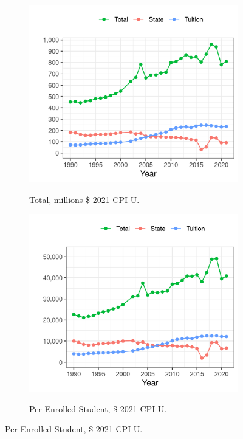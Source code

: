 \documentclass[notitlepage,12pt]{article}
\begin{document}
\begin{figure}[h!]
    \centering
    \singlespacing
    \caption{Mean Revenues among Illinois Public Universities, by Year.}
    \begin{subfigure}[b]{0.495\textwidth}
        \centering
        \caption{Total, millions \$ 2021 CPI-U.}
        \includegraphics[width=\textwidth]{figures/illinois-funding-total.png}
        \label{fig:illinois-funding-total}
    \end{subfigure}
    \begin{subfigure}[b]{0.495\textwidth}
        \centering
        \caption{Per Enrolled Student, \$ 2021 CPI-U.}
        \includegraphics[width=\textwidth]{figures/illinois-funding-fte.png}
        \label{fig:illinois-funding-fte}
    \end{subfigure}
    \label{fig:illinois-funding}
\end{figure}
\end{document}
